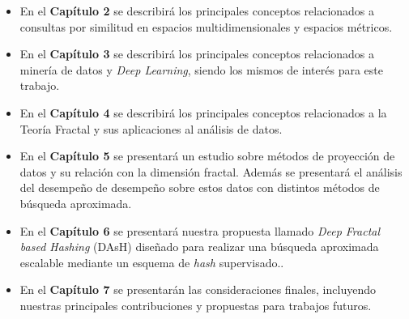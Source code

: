 \begin{itemize}
    \item En el \textbf{Capítulo 2} se describirá los principales conceptos relacionados a consultas por similitud en espacios multidimensionales y espacios métricos. 
    \item En el \textbf{Capítulo 3} se describirá los principales conceptos relacionados a minería de datos y \textit{Deep Learning}, siendo los mismos de interés para este trabajo.
    
    \item En el \textbf{Capítulo 4} se describirá los principales conceptos relacionados a la Teoría Fractal y sus aplicaciones   al análisis de datos.
    
    \item En el \textbf{Capítulo 5} se presentará  un estudio sobre métodos de proyección de datos y su relación con la dimensión fractal. Además se presentará el análisis del desempeño  de desempeño sobre estos datos con distintos  métodos de búsqueda aproximada. 


     \item En el \textbf{Capítulo 6} se presentará nuestra propuesta llamado \textit{Deep Fractal based  Hashing} (DAsH) diseñado para realizar una búsqueda aproximada escalable mediante un esquema de \textit{hash} supervisado..
     
    
    \item En el \textbf{Capítulo 7} se presentarán las consideraciones finales, incluyendo nuestras principales contribuciones y propuestas para trabajos futuros.
    
\end{itemize}




